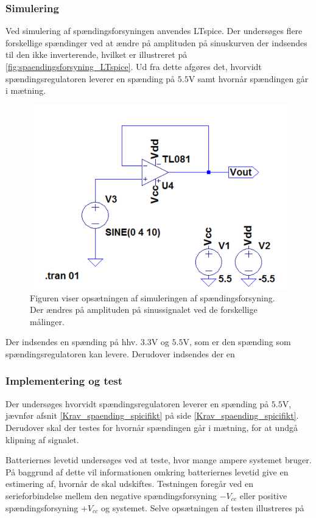 \subsubsection{Simulering}
Ved simulering af spændingsforsyningen anvendes LTspice. Der undersøges flere forskellige spændinger ved at ændre på amplituden på sinuskurven der indsendes til den ikke inverterende, hvilket er illustreret på \ref{fig:spaendingsforsyning_LTspice}. Ud fra dette afgøres det, hvorvidt spændingsregulatoren leverer en spænding på $5.5$V samt hvornår spændingen går i mætning. 
\begin{figure}[H]
\centering
\includegraphics[scale=0.5]{figures/cProblemloesning/Spaendingsforsyning_LTspice.PNG}
\caption{Figuren viser opsætningen af simuleringen af spændingsforsyning. Der ændres på amplituden på sinussignalet ved de forskellige målinger.}
\label{fig:splitsupply}
\end{figure}
Der indsendes en spænding på hhv. $3.3$V og $5.5$V, som er den spænding som spændingsregulatoren kan levere. Derudover indsendes der en 


\subsubsection{Implementering og test}
Der undersøges hvorvidt spændingsregulatoren leverer en spænding på $5.5$V, jævnfør afsnit \ref{Krav_spaending_spicifikt} på side \ref{Krav_spaending_spicifikt}. Derudover skal der testes for hvornår spændingen går i mætning, for at undgå klipning af signalet.


Batteriernes levetid undersøges ved at teste, hvor mange ampere systemet bruger. På baggrund af dette vil informationen omkring batteriernes levetid give en estimering af, hvornår de skal udskiftes. Testningen foregår ved en serieforbindelse mellem den negative spændingsforsyning $-V_{cc}$ eller positive spændingsforsyning $+V_{cc}$ og systemet. Selve opsætningen af testen illustreres på %

